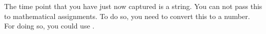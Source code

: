 The time point that you have just now captured is a string. You can not pass this to mathematical assignments. To do so, you need to convert this to a number. For doing so, you could use .